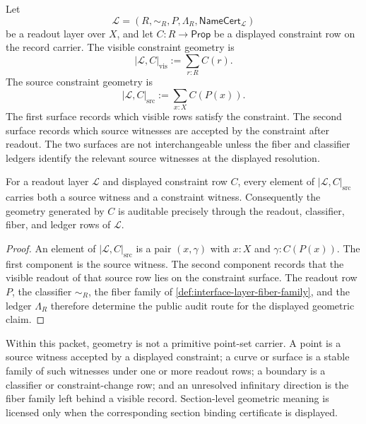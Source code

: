 \begin{definition}
\label{def:interface-constraint-geometry-surface}
Let
$$
\mathcal L=(R,\sim_R,P,\Lambda_R,\mathsf{NameCert}_{\mathcal L})
$$
be a readout layer over $X$, and let $C:R\to\mathsf{Prop}$ be a displayed
constraint row on the record carrier. The visible constraint geometry is
$$
|\mathcal L,C|_{\mathrm{vis}}
:=
\sum_{r:R}C(r).
$$
The source constraint geometry is
$$
|\mathcal L,C|_{\mathrm{src}}
:=
\sum_{x:X}C(P(x)).
$$
The first surface records which visible rows satisfy the constraint. The
second surface records which source witnesses are accepted by the
constraint after readout. The two surfaces are not interchangeable unless
the fiber and classifier ledgers identify the relevant source witnesses
at the displayed resolution.
\end{definition}

\begin{theorem}
\label{thm:interface-constraints-generate-auditable-geometry}
For a readout layer $\mathcal L$ and displayed constraint row $C$, every
element of $|\mathcal L,C|_{\mathrm{src}}$ carries both a source witness
and a constraint witness. Consequently the geometry generated by $C$ is
auditable precisely through the readout, classifier, fiber, and ledger
rows of $\mathcal L$.
\end{theorem}

\begin{proof}
An element of $|\mathcal L,C|_{\mathrm{src}}$ is a pair $(x,\gamma)$ with
$x:X$ and $\gamma:C(P(x))$. The first component is the source witness.
The second component records that the visible readout of that source row
lies on the constraint surface. The readout row $P$, the classifier
$\sim_R$, the fiber family of \autoref{def:interface-layer-fiber-family},
and the ledger $\Lambda_R$ therefore determine the public audit route for
the displayed geometric claim.
\end{proof}

\begin{principle}
\label{prin:interface-geometry-constraint-fiber-section}
Within this packet, geometry is not a primitive point-set carrier. A
point is a source witness accepted by a displayed constraint; a curve or
surface is a stable family of such witnesses under one or more readout
rows; a boundary is a classifier or constraint-change row; and an
unresolved infinitary direction is the fiber family left behind a visible
record. Section-level geometric meaning is licensed only when the
corresponding section binding certificate is displayed.
\end{principle}

